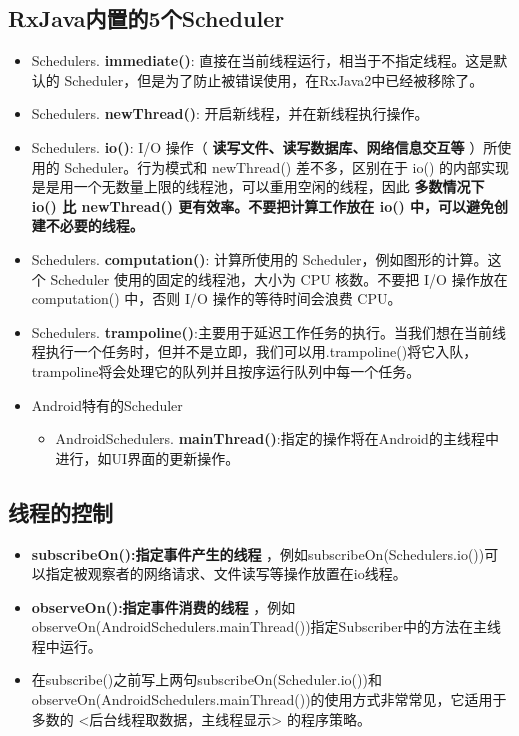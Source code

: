 \documentclass[9pt, b5paper]{article}
\begin{document}
\subsection{RxJava内置的5个Scheduler}
\label{sec-16-1}
\begin{itemize}
\item Schedulers. \textbf{immediate()}: 直接在当前线程运行，相当于不指定线程。这是默认的 Scheduler，但是为了防止被错误使用，在RxJava2中已经被移除了。
\item Schedulers. \textbf{newThread()}: 开启新线程，并在新线程执行操作。
\item Schedulers. \textbf{io()}: I/O 操作（ \textbf{读写文件、读写数据库、网络信息交互等} ）所使用的 Scheduler。行为模式和 newThread() 差不多，区别在于 io() 的内部实现是是用一个无数量上限的线程池，可以重用空闲的线程，因此 \textbf{多数情况下 io() 比 newThread() 更有效率。不要把计算工作放在 io() 中，可以避免创建不必要的线程。}
\item Schedulers. \textbf{computation()}: 计算所使用的 Scheduler，例如图形的计算。这个 Scheduler 使用的固定的线程池，大小为 CPU 核数。不要把 I/O 操作放在 computation() 中，否则 I/O 操作的等待时间会浪费 CPU。
\item Schedulers. \textbf{trampoline()}:主要用于延迟工作任务的执行。当我们想在当前线程执行一个任务时，但并不是立即，我们可以用.trampoline()将它入队，trampoline将会处理它的队列并且按序运行队列中每一个任务。
\item Android特有的Scheduler
\begin{itemize}
\item AndroidSchedulers. \textbf{mainThread()}:指定的操作将在Android的主线程中进行，如UI界面的更新操作。
\end{itemize}
\end{itemize}
\subsection{线程的控制}
\label{sec-16-2}
\begin{itemize}
\item \textbf{subscribeOn():指定事件产生的线程} ，例如subscribeOn(Schedulers.io())可以指定被观察者的网络请求、文件读写等操作放置在io线程。
\item \textbf{observeOn():指定事件消费的线程} ，例如observeOn(AndroidSchedulers.mainThread())指定Subscriber中的方法在主线程中运行。
\item 在subscribe()之前写上两句subscribeOn(Scheduler.io())和observeOn(AndroidSchedulers.mainThread())的使用方式非常常见，它适用于多数的 <后台线程取数据，主线程显示> 的程序策略。
\end{itemize}
\end{document}
